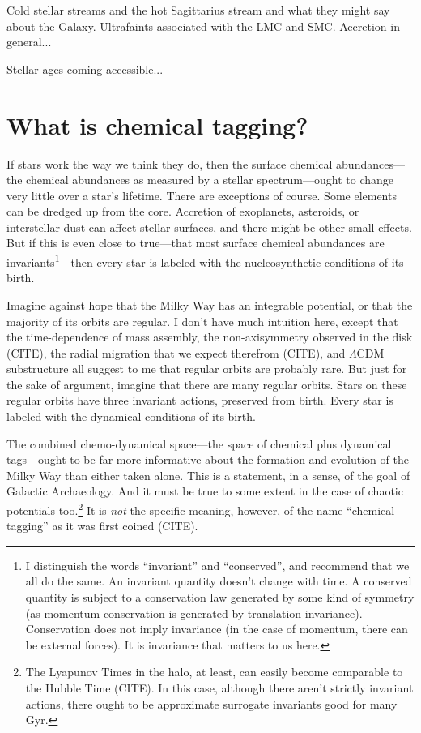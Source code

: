 \documentclass[11pt, letterpaper]{article}
\begin{document}
Cold stellar streams and the hot Sagittarius stream and what they
might say about the Galaxy. Ultrafaints associated with the LMC and
SMC. Accretion in general...

Stellar ages coming accessible...

\section{What is chemical tagging?}

If stars work the way we think they do, then the surface chemical
abundances---the chemical abundances as measured by a stellar
spectrum---ought to change very little over a star's lifetime. There
are exceptions of course. Some elements can be dredged up from the
core. Accretion of exoplanets, asteroids, or interstellar dust can
affect stellar surfaces, and there might be other small effects. But
if this is even close to true---that most surface chemical abundances
are invariants\footnote{I distinguish the words ``invariant'' and
  ``conserved'', and recommend that we all do the same. An invariant
  quantity doesn't change with time. A conserved quantity is subject
  to a conservation law generated by some kind of symmetry (as
  momentum conservation is generated by translation
  invariance). Conservation does not imply invariance (in the case of
  momentum, there can be external forces). It is invariance that
  matters to us here.}---then every star is labeled with the
nucleosynthetic conditions of its birth.

Imagine against hope that the Milky Way has an integrable potential,
or that the majority of its orbits are regular. I don't have much
intuition here, except that the time-dependence of mass assembly, the
non-axisymmetry observed in the disk (CITE), the radial migration
that we expect therefrom (CITE), and $\Lambda$CDM substructure all
suggest to me that regular orbits are probably rare. But just for the
sake of argument, imagine that there are many regular orbits. Stars on
these regular orbits have three invariant actions, preserved from
birth. Every star is labeled with the dynamical conditions of its
birth.

The combined chemo-dynamical space---the space of chemical plus
dynamical tags---ought to be far more informative about the formation
and evolution of the Milky Way than either taken alone. This is a
statement, in a sense, of the goal of Galactic Archaeology.  And it
must be true to some extent in the case of chaotic potentials
too.\footnote{The Lyapunov Times in the halo, at least, can easily
  become comparable to the Hubble Time (CITE). In this case, although
  there aren't strictly invariant actions, there ought to be
  approximate surrogate invariants good for many Gyr.} It is
\emph{not} the specific meaning, however, of the name ``chemical
tagging'' as it was first coined (CITE).
\end{document}

